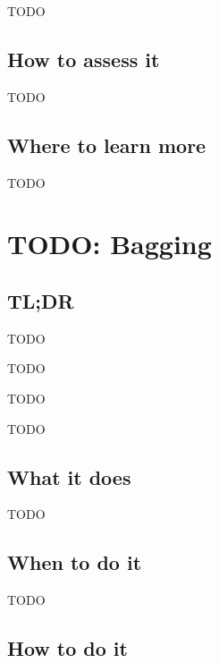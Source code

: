 \documentclass[
]{book}
\providecommand{\tightlist}{%
  \setlength{\itemsep}{0pt}\setlength{\parskip}{0pt}}
\begin{document}
TODO

\hypertarget{how-to-assess-it-15}{%
\section{How to assess it}\label{how-to-assess-it-15}}

TODO

\hypertarget{where-to-learn-more-15}{%
\section{Where to learn more}\label{where-to-learn-more-15}}

TODO

\hypertarget{bagging}{%
\chapter{TODO: Bagging}\label{bagging}}

\hypertarget{tldr-16}{%
\section{TL;DR}\label{tldr-16}}

\begin{description}
\tightlist
\item[What it does]
TODO
\item[When to do it]
TODO
\item[How to do it]
TODO
\item[How to assess it]
TODO
\end{description}

\hypertarget{what-it-does-16}{%
\section{What it does}\label{what-it-does-16}}

TODO

\hypertarget{when-to-do-it-16}{%
\section{When to do it}\label{when-to-do-it-16}}

TODO

\hypertarget{how-to-do-it-16}{%
\section{How to do it}\label{how-to-do-it-16}}
\end{document}
